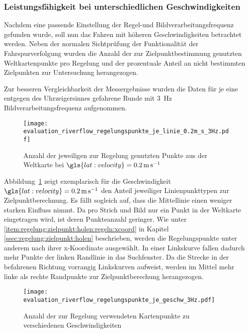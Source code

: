 \subsubsection{Leistungsfähigkeit bei unterschiedlichen Geschwindigkeiten}

Nachdem eine passende Einstellung der Regel-und Bildverarbeitungsfrequenz gefunden wurde, soll nun das Fahren mit höheren Geschwindigkeiten betrachtet werden. Neben der normalen Sichtprüfung der Funktionalität der Fahrspurverfolgung wurden die Anzahl der zur Zielpunktbestimmung genutzten Weltkartenpunkte pro Regelung und der prozentuale Anteil an nicht bestimmten Zielpunkten zur Untersuchung herangezogen. 

Zur besseren Vergleichbarkeit der Messergebnisse wurden die Daten für je eine entgegen des Uhrzeigersinnes gefahrene Runde mit \SI{3}{\hertz} Bildverarbeitungsfrequenz aufgenommen.

\begin{figure}[h] %
	\centering
	\texttt{[image: evaluation\_riverflow\_regelungspunkte\_je\_linie\_0.2m\_s\_3Hz.pdf]}
	\caption{Anzahl der jeweiligen zur Regelung genutzten Punkte aus der Weltkarte bei \( \gls{lat:velocity} = \SI{0,2}{\metre\per\second} \)}
	\label{fig:evaluation:riverflow:regelungspunkte_je_linie}
\end{figure}

Abbildung~\ref{fig:evaluation:riverflow:regelungspunkte_je_linie} zeigt exemplarisch für die Geschwindigkeit \( \gls{lat:velocity} = \SI{0,2}{\metre\per\second} \) den  Anteil jeweiliger Linienpunkttypen zur Zielpunktberechnung. Es fällt sogleich auf, dass die Mittellinie einen weniger starken Einfluss nimmt. Da pro Strich und Bild nur ein Punkt in der Weltkarte eingetragen wird, ist deren Punkteanzahl geringer. Wie unter \ref{item:regelung:zielpunkt:holen:regeln:xcoord} in Kapitel \ref{ssec:regelung:zielpunkt:holen} beschrieben, werden die Regelungspunkte unter anderem nach ihrer x-Koordinate ausgewählt. In einer Linkskurve fallen dadurch mehr Punkte der linken Randlinie in das Suchfenster. Da die Strecke in der befahrenen Richtung vorrangig Linkskurven aufweist, werden im Mittel mehr linke als rechte Randpunkte zur Zielpunktberechung herangezogen.

\begin{figure}[h] %
	\centering
	\texttt{[image: evaluation\_riverflow\_regelungspunkte\_je\_geschw\_3Hz.pdf]}
	\caption{Anzahl der zur Regelung verwendeten Kartenpunkte zu verschiedenen Geschwindigkeiten}
	\label{fig:evaluation:riverflow:regelungspunkte_je_geschw}
\end{figure}


